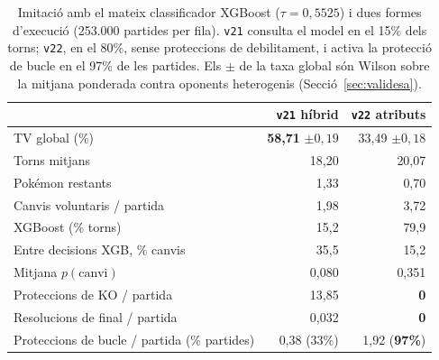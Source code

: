 \begin{table}[htbp]
\centering
\caption{Imitació amb el mateix classificador XGBoost ($\tau=0{,}5525$) i dues formes d'execució (253.000 partides per fila). \texttt{v21} consulta el model en el 15\% dels torns; \texttt{v22}, en el 80\%, sense proteccions de debilitament, i activa la protecció de bucle en el 97\% de les partides. Els $\pm$ de la taxa global són Wilson sobre la mitjana ponderada contra oponents heterogenis (Secció~\ref{sec:validesa}).}
\label{tab:il_head}
\small
\begin{tabular}{lrr}
\toprule
 & \textbf{\texttt{v21} híbrid} & \textbf{\texttt{v22} atributs} \\
\midrule
TV global (\%) & \textbf{58,71} $\pm 0{,}19$ & 33,49 $\pm 0{,}18$ \\
Torns mitjans & 18,20 & 20,07 \\
Pokémon restants & 1,33 & 0,70 \\
Canvis voluntaris / partida & 1,98 & 3,72 \\
XGBoost (\% torns) & 15,2 & 79,9 \\
Entre decisions XGB, \% canvis & 35,5 & 15,2 \\
Mitjana $p(\mathrm{canvi})$ & 0,080 & 0,351 \\
Proteccions de KO / partida & 13,85 & \textbf{0} \\
Resolucions de final / partida & 0,032 & \textbf{0} \\
Proteccions de bucle / partida (\% partides) & 0,38 (33\%) & 1,92 (\textbf{97\%}) \\
\bottomrule
\end{tabular}
\end{table}
